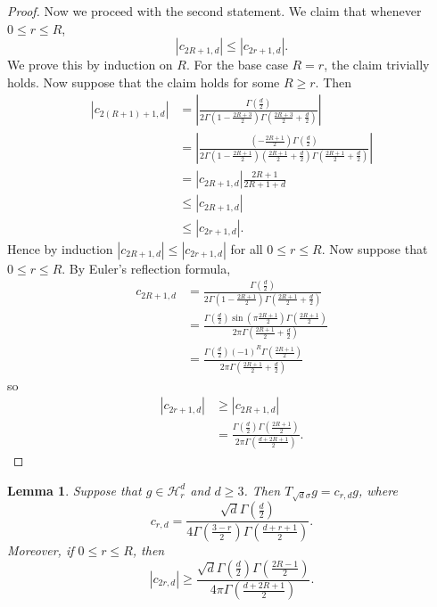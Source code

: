 \documentclass{article}
\newtheorem{lemma}[theorem]{Lemma}
\theoremstyle{definition}
\newcommand{\mc}{\mathcal}
\begin{document}
\begin{proof}
    Now we proceed with the second statement. We claim that whenever $0 \leq r \leq R$,
    \[|c_{2R + 1, d}| \leq |c_{2r + 1, d}|. \]
    We prove this by induction on $R$. For the base case $R = r$, the claim trivially holds. Now suppose that the claim holds for some $R \geq r$. Then
    \begin{align*}
        |c_{2(R + 1) + 1, d}| &= \left|\frac{\Gamma\left(\frac{d}{2}\right) }{2\Gamma\left(1 - \frac{2R + 3}{2}\right)\Gamma\left(\frac{2R + 3}{2} + \frac{d}{2}\right)  }\right|\\
        &= \left|\frac{\left(-\frac{2R + 1}{2}\right)
 \Gamma\left(\frac{d}{2}\right) }{2\Gamma\left(1 - \frac{2R + 1}{2}\right)\left(\frac{2R + 1}{2} + \frac{d}{2}\right)
 \Gamma\left(\frac{2R + 1}{2} + \frac{d}{2}\right)  }\right|\\
 &= |c_{2R + 1, d}| \frac{2R + 1}{2R + 1 + d}\\
 &\leq |c_{2R + 1, d}|\\
 &\leq |c_{2r + 1, d}| . 
    \end{align*}
    Hence by induction $|c_{2R + 1, d}| \leq |c_{2r + 1, d}|$ for all $0 \leq r \leq R$.
    Now suppose that $0 \leq r \leq R$. By Euler's reflection formula,
    \begin{align*}
        c_{2R + 1, d} &= \frac{\Gamma\left(\frac{d}{2} \right) }{2\Gamma\left(1 - \frac{2R + 1}{2}\right) \Gamma\left(\frac{2R + 1}{2} + \frac{d}{2}\right) }\\
        &= \frac{\Gamma\left(\frac{d}{2}\right)\sin\left(\pi \frac{2R + 1}{2} \right)\Gamma\left(\frac{2R + 1}{2}\right) }{2\pi \Gamma\left(\frac{2R + 1}{2} + \frac{d}{2}\right) }\\
        &= \frac{\Gamma\left(\frac{d}{2}\right)(-1)^R \Gamma\left(\frac{2R + 1}{2}\right) }{2\pi \Gamma\left(\frac{2R + 1}{2} + \frac{d}{2}\right) }
    \end{align*}
    so
    \begin{align*}
        |c_{2r +1 , d}| &\geq |c_{2R + 1, d}|\\
        &= \frac{\Gamma\left(\frac{d}{2}\right)\Gamma\left(\frac{2R + 1}{2}\right) }{2\pi \Gamma\left(\frac{d + 2R + 1}{2}\right) }.
    \end{align*}
\end{proof}
\begin{lemma}\label{lem:eigendecomposition-relu}
    Suppose that $g \in \mc{H}_r^d$ and $d \geq 3$. Then $T_{\sqrt{d}\sigma}g = c_{r, d}g$, where
    \[c_{r, d} = \frac{\sqrt{d}\Gamma\left(\frac{d}{2}\right) }{4\Gamma\left(\frac{3 - r}{2}\right)\Gamma\left(\frac{d + r + 1}{2}\right)  }. \]
    Moreover, if $0 \leq r \leq R$, then
    \[|c_{2r, d}| \geq \frac{\sqrt{d}\Gamma\left(\frac{d}{2}\right) \Gamma\left(\frac{2R - 1}{2}\right) }{4\pi \Gamma\left(\frac{d + 2R + 1}{2}\right) }. \]
\end{lemma}
\end{document}
